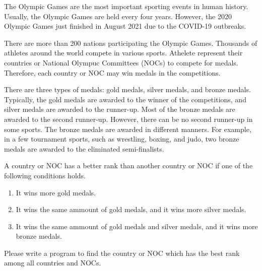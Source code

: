 The Olympic Games are the most important sporting events in human history.
Usually, the Olympic Games are held every four years.
However, the 2020 Olympic Games just finished in August 2021 due to
the COVID-19 outbreaks.

There are more than 200 nations participating the Olympic Games. 
Thousands of athletes around the world compete in various sports. 
Athelete represent their countries or National Olympuc Committees (NOCs)
to compete for medals. 
Therefore, each country or NOC may win medals in the competitions.

There are three types of medals: gold medals, silver medals, and bronze medals. 
Typically, the gold medals are awarded to the winner of the competitions,
and silver medals are awarded to the runner-up.
Most of the bronze medals are awarded to the second runner-up.
However, there can be no second runner-up in some sports.
The bronze medals are awarded in different manners. 
For example, in a few tournament sports, such as wrestling, boxing, and judo,
two bronze medals are awarded to the eliminated semi-finalists. 

A country or NOC has a better rank than another country or NOC
if one of the following conditions holds.
\begin{enumerate}
\item It wins more gold medals.
\item It wins the same ammount of gold medals, and it wins more silver medals.
\item It wins the same ammount of gold medals and silver medals, 
and it wins more bronze medals.
\end{enumerate}

Please write a program to find the country or NOC which has the best rank
among all countries and NOCs.
